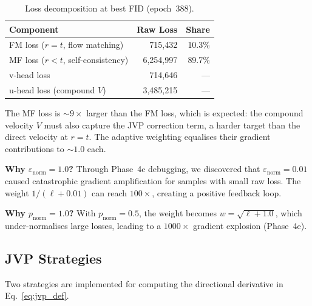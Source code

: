 \documentclass[11pt,a4paper]{article}
\begin{document}
\begin{table}[ht]
\centering
\caption{Loss decomposition at best FID (epoch~388).}
\label{tab:loss_decomp}
\begin{tabular}{lrr}
\toprule
\textbf{Component} & \textbf{Raw Loss} & \textbf{Share} \\
\midrule
FM loss ($r=t$, flow matching)       & 715,432   & 10.3\% \\
MF loss ($r<t$, self-consistency)    & 6,254,997 & 89.7\% \\
\midrule
v-head loss                          & 714,646   & --- \\
u-head loss (compound $V$)           & 3,485,215 & --- \\
\bottomrule
\end{tabular}
\end{table}

The MF loss is ${\sim}9\times$ larger than the FM loss, which is expected: the
compound velocity $V$ must also capture the JVP correction term, a harder
target than the direct velocity at $r{=}t$.  The adaptive weighting equalises
their gradient contributions to ${\sim}1.0$ each.

\textbf{Why $\varepsilon_{\mathrm{norm}}{=}1.0$?}  Through Phase~4c debugging,
we discovered that $\varepsilon_{\mathrm{norm}}{=}0.01$ caused catastrophic
gradient amplification for samples with small raw loss.  The weight
$1/(\ell+0.01)$ can reach $100\times$, creating a positive feedback loop.

\textbf{Why $p_{\mathrm{norm}}{=}1.0$?}  With $p_{\mathrm{norm}}{=}0.5$, the
weight becomes $w = \sqrt{\ell+1.0}$, which under-normalises large
losses, leading to a $1000\times$ gradient explosion (Phase~4e).

\subsection{JVP Strategies}
\label{sec:jvp_strat}

Two strategies are implemented for computing the directional derivative in
Eq.~\eqref{eq:jvp_def}.
\end{document}
